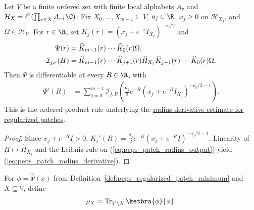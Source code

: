 \begin{lemma}
    \label{thm:peps_patch_radius_derivative}
    \leanok
    Let $V$ be a finite ordered set with finite local alphabets $A_v$
    and $\mathcal H_X=\ell^2(\prod_{v\in X}A_v;\C)$.
    Fix $X_0,\ldots,X_{m-1}\subseteq V$, $a_j\in\R$,
    $x_j\ge0$ on $\mathcal H_{X_j}$, and $\Omega\in\mathcal H_V$.
    For $r\in\R$, set $K_j(r)=(x_j+e^{-r}I_{X_j})^{-a_j/2}$ and
    \begin{align}
        \Psi(r)             & =\widehat K_{m-1}(r)\cdots\widehat K_0(r)\Omega,\notag \\
        \mathcal I_{j,r}(H) & =
        \widehat K_{m-1}(r)\cdots\widehat K_{j+1}(r)
        \widehat H_{X_j}
        \widehat K_{j-1}(r)\cdots\widehat K_0(r)\Omega.
        \label{eq:peps_patch_radius_output}
    \end{align}
    Then $\Psi$ is differentiable at every $R\in\R$, with
    \begin{align}
        \Psi'(R)
         & =\sum_{j=0}^{m-1}\mathcal I_{j,R}\!\left(
        \frac{a_j}{2}e^{-R}
        (x_j+e^{-R}I_{X_j})^{-a_j/2-1}\right).
        \label{eq:peps_patch_radius_derivative}
    \end{align}
    This is the ordered product rule underlying the
    \href{https://github.com/openai/math/blob/adc7f1241b42e322a6451854ab7e4b4c146bf78a/preprints/Polynomial-PEPS-approximation-of-gapped-square-grid-ground-states-September-24-2026/build/sections/03-patches.tex\#L425-L437}{radius derivative estimate for regularized patches}.
\end{lemma}
\begin{proof}
    \leanok
    Since $x_j+e^{-R}I>0$, $K_j'(R)=\frac{a_j}{2}e^{-R}(x_j+e^{-R}I)^{-a_j/2-1}$.
    Linearity of $H\mapsto\widehat H_{X_j}$ and the Leibniz rule on (\ref{eq:peps_patch_radius_output}) yield (\ref{eq:peps_patch_radius_derivative}).
\end{proof}

\begin{definition}
    \label{def:peps_patch_canonical_marginal}
    \leanok
    For $\phi=\widehat\Psi(x)$ from Definition~\ref{def:peps_regularized_patch_minimum} and $X\subseteq V$, define
    \begin{align}
        \rho_X=\operatorname{Tr}_{V\setminus X}
        \ketbra{\phi}{\phi}.
        \label{eq:peps_canonical_marginal}
    \end{align}
\end{definition}

